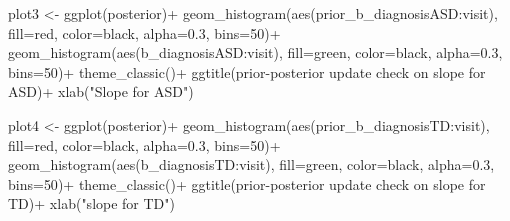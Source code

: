 \documentclass[
]{article}
\newenvironment{Shaded}{\begin{snugshade}}{\end{snugshade}}
\newcommand{\AttributeTok}[1]{\textcolor[rgb]{0.77,0.63,0.00}{#1}}
\newcommand{\DecValTok}[1]{\textcolor[rgb]{0.00,0.00,0.81}{#1}}
\newcommand{\FloatTok}[1]{\textcolor[rgb]{0.00,0.00,0.81}{#1}}
\newcommand{\FunctionTok}[1]{\textcolor[rgb]{0.00,0.00,0.00}{#1}}
\newcommand{\NormalTok}[1]{#1}
\newcommand{\OtherTok}[1]{\textcolor[rgb]{0.56,0.35,0.01}{#1}}
\newcommand{\SpecialCharTok}[1]{\textcolor[rgb]{0.00,0.00,0.00}{#1}}
\newcommand{\StringTok}[1]{\textcolor[rgb]{0.31,0.60,0.02}{#1}}
\begin{document}
\begin{Shaded}
\begin{Highlighting}[]
\NormalTok{plot3 }\OtherTok{\textless{}{-}} \FunctionTok{ggplot}\NormalTok{(posterior)}\SpecialCharTok{+}
  \FunctionTok{geom\_histogram}\NormalTok{(}\FunctionTok{aes}\NormalTok{(}\StringTok{\textasciigrave{}}\AttributeTok{prior\_b\_diagnosisASD:visit}\StringTok{\textasciigrave{}}\NormalTok{), }\AttributeTok{fill=}\StringTok{\textquotesingle{}red\textquotesingle{}}\NormalTok{, }\AttributeTok{color=}\StringTok{\textquotesingle{}black\textquotesingle{}}\NormalTok{, }\AttributeTok{alpha=}\FloatTok{0.3}\NormalTok{, }\AttributeTok{bins=}\DecValTok{50}\NormalTok{)}\SpecialCharTok{+}
  \FunctionTok{geom\_histogram}\NormalTok{(}\FunctionTok{aes}\NormalTok{(}\StringTok{\textasciigrave{}}\AttributeTok{b\_diagnosisASD:visit}\StringTok{\textasciigrave{}}\NormalTok{), }\AttributeTok{fill=}\StringTok{\textquotesingle{}green\textquotesingle{}}\NormalTok{, }\AttributeTok{color=}\StringTok{\textquotesingle{}black\textquotesingle{}}\NormalTok{, }\AttributeTok{alpha=}\FloatTok{0.3}\NormalTok{, }\AttributeTok{bins=}\DecValTok{50}\NormalTok{)}\SpecialCharTok{+}
  \FunctionTok{theme\_classic}\NormalTok{()}\SpecialCharTok{+}
  \FunctionTok{ggtitle}\NormalTok{(}\StringTok{\textquotesingle{}prior{-}posterior update check on slope for ASD\textquotesingle{}}\NormalTok{)}\SpecialCharTok{+}
  \FunctionTok{xlab}\NormalTok{(}\StringTok{"Slope for ASD"}\NormalTok{)}

\NormalTok{plot4 }\OtherTok{\textless{}{-}} \FunctionTok{ggplot}\NormalTok{(posterior)}\SpecialCharTok{+}
  \FunctionTok{geom\_histogram}\NormalTok{(}\FunctionTok{aes}\NormalTok{(}\StringTok{\textasciigrave{}}\AttributeTok{prior\_b\_diagnosisTD:visit}\StringTok{\textasciigrave{}}\NormalTok{), }\AttributeTok{fill=}\StringTok{\textquotesingle{}red\textquotesingle{}}\NormalTok{, }\AttributeTok{color=}\StringTok{\textquotesingle{}black\textquotesingle{}}\NormalTok{, }\AttributeTok{alpha=}\FloatTok{0.3}\NormalTok{, }\AttributeTok{bins=}\DecValTok{50}\NormalTok{)}\SpecialCharTok{+}
  \FunctionTok{geom\_histogram}\NormalTok{(}\FunctionTok{aes}\NormalTok{(}\StringTok{\textasciigrave{}}\AttributeTok{b\_diagnosisTD:visit}\StringTok{\textasciigrave{}}\NormalTok{), }\AttributeTok{fill=}\StringTok{\textquotesingle{}green\textquotesingle{}}\NormalTok{, }\AttributeTok{color=}\StringTok{\textquotesingle{}black\textquotesingle{}}\NormalTok{, }\AttributeTok{alpha=}\FloatTok{0.3}\NormalTok{, }\AttributeTok{bins=}\DecValTok{50}\NormalTok{)}\SpecialCharTok{+}
  \FunctionTok{theme\_classic}\NormalTok{()}\SpecialCharTok{+}
  \FunctionTok{ggtitle}\NormalTok{(}\StringTok{\textquotesingle{}prior{-}posterior update check on slope for TD\textquotesingle{}}\NormalTok{)}\SpecialCharTok{+}
  \FunctionTok{xlab}\NormalTok{(}\StringTok{"slope for TD"}\NormalTok{)}



\end{Highlighting}
\end{Shaded}
\end{document}
